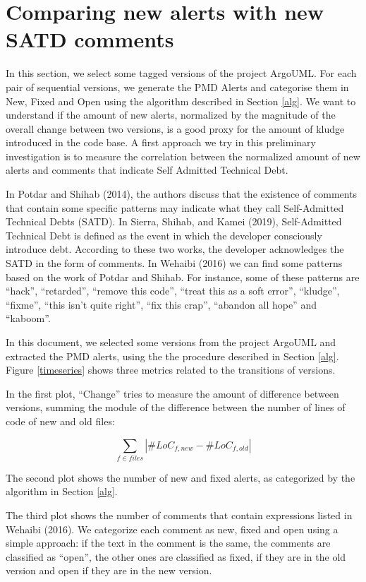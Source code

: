 \documentclass[
]{article}
\begin{document}
\section{Comparing new alerts with new SATD comments}\label{results}

In this section, we select some tagged versions of the project ArgoUML.
For each pair of sequential versions, we generate the PMD Alerts and
categorise them in New, Fixed and Open using the algorithm described in
Section \ref{alg}. We want to understand if the amount of new alerts,
normalized by the magnitude of the overall change between two versions,
is a good proxy for the amount of kludge introduced in the code base. A
first approach we try in this preliminary investigation is to measure
the correlation between the normalized amount of new alerts and comments
that indicate Self Admitted Technical Debt.

In Potdar and Shihab (2014), the authors discuss that the existence of
comments that contain some specific patterns may indicate what they call
Self-Admitted Technical Debts (SATD). In Sierra, Shihab, and Kamei
(2019), Self-Admitted Technical Debt is defined as the event in which
the developer consciously introduce debt. According to these two works,
the developer acknowledges the SATD in the form of comments. In Wehaibi
(2016) we can find some patterns based on the work of Potdar and Shihab.
For instance, some of these patterns are ``hack'', ``retarded'',
``remove this code'', ``treat this as a soft error'', ``kludge'',
``fixme'', ``this isn't quite right'', ``fix this crap'', ``abandon all
hope'' and ``kaboom''.

In this document, we selected some versions from the project ArgoUML and
extracted the PMD alerts, using the the procedure described in Section
\ref{alg}. Figure \ref{timeseries} shows three metrics related to the
transitions of versions.

In the first plot, ``Change'' tries to measure the amount of difference
between versions, summing the module of the difference between the
number of lines of code of new and old files:

\begin{equation} \label{eq_change} \sum_{f \in files}{|\#LoC_{f, new} - \#LoC_{f, old}|} \end{equation}

The second plot shows the number of new and fixed alerts, as categorized
by the algorithm in Section \ref{alg}.

The third plot shows the number of comments that contain expressions
listed in Wehaibi (2016). We categorize each comment as new, fixed and
open using a simple approach: if the text in the comment is the same,
the comments are classified as ``open'', the other ones are classified
as fixed, if they are in the old version and open if they are in the new
version.
\end{document}
